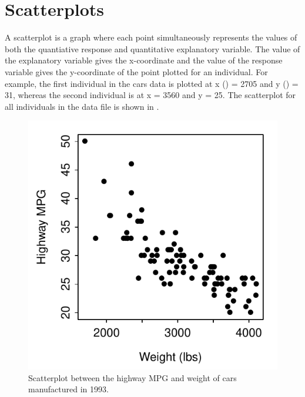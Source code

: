 \documentclass[10pt,openany]{book}\usepackage[]{graphicx}\usepackage[]{color}
\newenvironment{knitrout}{}{} %
\begin{document}
\section{Scatterplots} 
\vspace{-12pt}
A scatterplot is a graph where each point simultaneously represents the values of both the quantiative response and quantitative explanatory variable.  The value of the explanatory variable gives the x-coordinate and the value of the response variable gives the y-coordinate of the point plotted for an individual.  For example, the first individual in the cars data is plotted at x () = 2705 and y () = 31, whereas the second individual is at x = 3560 and y = 25.  The scatterplot for all individuals in the data file is shown in .
\begin{knitrout}
\color{fgcolor}\begin{figure}[hbtp]

{\centering \includegraphics[width=.4\linewidth]{Figs/carscat1-1} 

}

\caption[Scatterplot between the highway MPG and weight of cars manufactured in 1993]{Scatterplot between the highway MPG and weight of cars manufactured in 1993.}\label{fig:carscat1}
\end{figure}


\end{knitrout}


\vspace{-12pt}

\vspace{-6pt}
\end{document}
